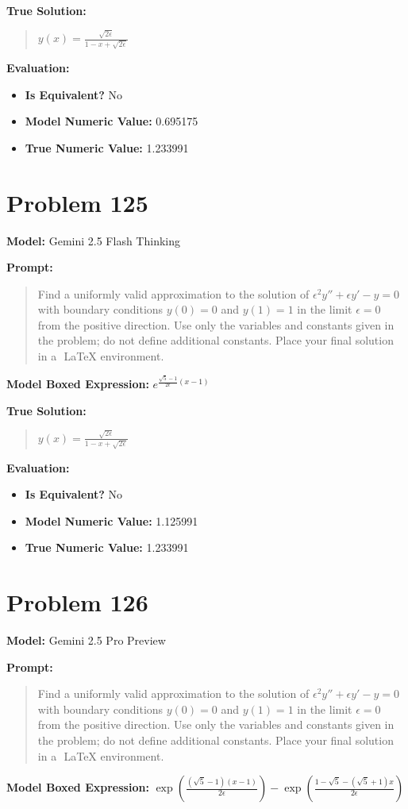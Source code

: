 \documentclass{article}
\begin{document}
{\textbf{True Solution:}
\begin{quote}
$y(x) = \frac{\sqrt{2\epsilon}}{1-x + \sqrt{2\epsilon}}$
\end{quote}

\textbf{Evaluation:}
\begin{itemize}
\item \textbf{Is Equivalent?} No
\item \textbf{Model Numeric Value:} 0.695175
\item \textbf{True Numeric Value:} 1.233991
\end{itemize}
\vspace{1cm}
\section*{Problem 125}
\textbf{Model:} Gemini 2.5 Flash Thinking

\textbf{Prompt:}
\begin{quote}
Find a uniformly valid approximation to the solution of $\epsilon^2 y'' + \epsilon y' - y = 0$ with boundary conditions $y(0) = 0$ and $y(1) = 1$ in the limit $\epsilon = 0$ from the positive direction. Use only the variables and constants given in the problem; do not define additional constants. Place your final solution in a $\boxed{}$ LaTeX environment.
\end{quote}
\textbf{Model Boxed Expression:} $e^{\frac{\sqrt{5}-1}{2\epsilon}(x-1)}$

\textbf{True Solution:}
\begin{quote}
$y(x) = \frac{\sqrt{2\epsilon}}{1-x + \sqrt{2\epsilon}}$
\end{quote}

\textbf{Evaluation:}
\begin{itemize}
\item \textbf{Is Equivalent?} No
\item \textbf{Model Numeric Value:} 1.125991
\item \textbf{True Numeric Value:} 1.233991
\end{itemize}
\vspace{1cm}
\section*{Problem 126}
\textbf{Model:} Gemini 2.5 Pro Preview

\textbf{Prompt:}
\begin{quote}
Find a uniformly valid approximation to the solution of $\epsilon^2 y'' + \epsilon y' - y = 0$ with boundary conditions $y(0) = 0$ and $y(1) = 1$ in the limit $\epsilon = 0$ from the positive direction. Use only the variables and constants given in the problem; do not define additional constants. Place your final solution in a $\boxed{}$ LaTeX environment.
\end{quote}
\textbf{Model Boxed Expression:} $\exp\left(\frac{(\sqrt{5}-1)(x-1)}{2\epsilon}\right) - \exp\left(\frac{1-\sqrt{5}-(\sqrt{5}+1)x}{2\epsilon}\right)$

}
\end{document}
